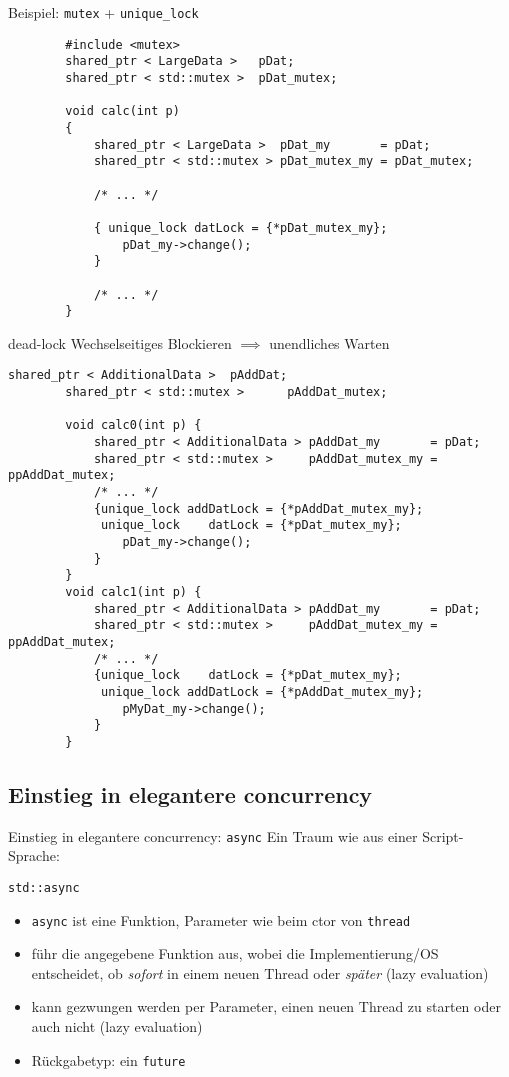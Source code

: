 \begin{frame}[fragile]{ Beispiel: \texttt{mutex} + \texttt{unique\_lock} }
	\begin{lstlisting}
		#include <mutex>
		shared_ptr < LargeData >   pDat;
		shared_ptr < std::mutex >  pDat_mutex;
		
		void calc(int p)
		{
		    shared_ptr < LargeData >  pDat_my       = pDat;
		    shared_ptr < std::mutex > pDat_mutex_my = pDat_mutex;
			
		    /* ... */
			
		    { unique_lock datLock = {*pDat_mutex_my};
		        pDat_my->change();
		    }
			
		    /* ... */
		}
	\end{lstlisting}
\end{frame}

\begin{frame}[fragile]{dead-lock}
	\footnotesize
	\alert{Wechselseitiges Blockieren $\implies$ unendliches Warten}
	
	\begin{lstlisting}[basicstyle=\scriptsize]
		shared_ptr < AdditionalData >  pAddDat;
		shared_ptr < std::mutex >      pAddDat_mutex;
		
		void calc0(int p) {
		    shared_ptr < AdditionalData > pAddDat_my       = pDat;
		    shared_ptr < std::mutex >     pAddDat_mutex_my = ppAddDat_mutex;
		    /* ... */
		    {unique_lock addDatLock = {*pAddDat_mutex_my};
		     unique_lock    datLock = {*pDat_mutex_my};
		        pDat_my->change();
		    }
		}
		void calc1(int p) {
		    shared_ptr < AdditionalData > pAddDat_my       = pDat;
		    shared_ptr < std::mutex >     pAddDat_mutex_my = ppAddDat_mutex;
		    /* ... */
		    {unique_lock    datLock = {*pDat_mutex_my};
		     unique_lock addDatLock = {*pAddDat_mutex_my};
		        pMyDat_my->change();
		    }
		}
	\end{lstlisting}
\end{frame}


\subsection{Einstieg in elegantere concurrency}

\begin{frame}{Einstieg in elegantere concurrency: \texttt{async}}
	Ein Traum wie aus einer Script-Sprache:
	\begin{block}{ \texttt{std::async} }
		\begin{itemize}
			\item \texttt{async} ist eine Funktion, Parameter wie beim ctor von \texttt{thread}
			\item führ die angegebene Funktion aus, wobei die Implementierung/OS entscheidet, ob \emph{sofort} in einem neuen Thread oder \emph{später} (lazy evaluation)
			\item kann gezwungen werden per Parameter, einen neuen Thread zu starten oder auch nicht (lazy evaluation)
			\item Rückgabetyp: ein \texttt{future}
		\end{itemize}
	\end{block}
\end{frame}

